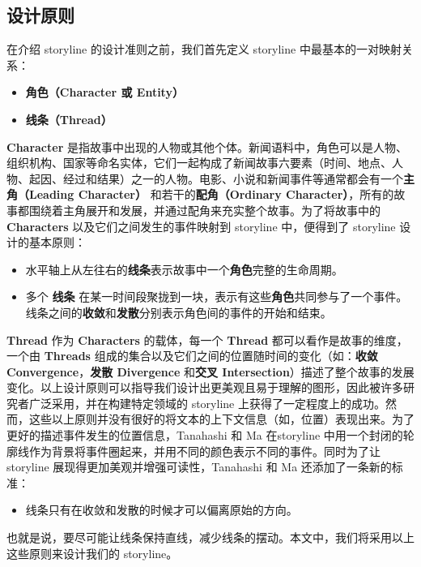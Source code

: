 \subsection{设计原则}
在介绍 storyline 的设计准则之前，我们首先定义 storyline 中最基本的一对映射关系：
\begin{itemize}
\item \textbf{角色（Character 或 Entity）}
\item \textbf{线条（Thread）}
\end{itemize}
\textbf{Character} 是指故事中出现的人物或其他个体。新闻语料中，角色可以是人物、组织机构、国家等命名实体，它们一起构成了新闻故事六要素（时间、地点、人物、起因、经过和结果）之一的人物。电影、小说和新闻事件等通常都会有一个\textbf{主角（Leading Character）} 和若干的\textbf{配角（Ordinary Character）}，所有的故事都围绕着主角展开和发展，并通过配角来充实整个故事。为了将故事中的 \textbf{Characters} 以及它们之间发生的事件映射到 storyline 中，便得到了 storyline 设计的基本原则：
\begin{itemize}
\item 水平轴上从左往右的\textbf{线条}表示故事中一个\textbf{角色}完整的生命周期。
\item 多个 \textbf{线条} 在某一时间段聚拢到一块，表示有这些\textbf{角色}共同参与了一个事件。线条之间的\textbf{收敛}和\textbf{发散}分别表示角色间的事件的开始和结束。
\end{itemize}
\textbf{Thread} 作为 \textbf{Characters} 的载体，每一个 \textbf{Thread}  都可以看作是故事的维度，一个由 \textbf{Threads} 组成的集合以及它们之间的位置随时间的变化（如：\textbf{收敛 Convergence}，\textbf{发散 Divergence} 和\textbf{交叉 Intersection}）描述了整个故事的发展变化。以上设计原则可以指导我们设计出更美观且易于理解的图形，因此被许多研究者广泛采用\cite{Ogawa:2010, Kim:2010}，并在构建特定领域的 storyline 上获得了一定程度上的成功。然而，这些以上原则并没有很好的将文本的上下文信息（如，位置）表现出来。为了更好的描述事件发生的位置信息，Tanahashi 和 Ma \cite{tanahashi2012design} 在storyline 中用一个封闭的轮廓线作为背景将事件圈起来，并用不同的颜色表示不同的事件。同时为了让 storyline 展现得更加美观并增强可读性，Tanahashi 和 Ma 还添加了一条新的标准：
\begin{itemize}
\item 线条只有在收敛和发散的时候才可以偏离原始的方向。
\end{itemize}
也就是说，要尽可能让线条保持直线，减少线条的摆动。本文中，我们将采用以上这些原则来设计我们的 storyline。

